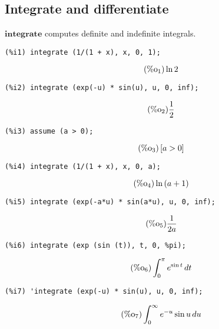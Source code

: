 \documentclass[12pt,leqno]{article}
\begin{document}
\subsection{Integrate and differentiate}

$\mathbf{integrate}$ computes definite and indefinite integrals.
\begin{verbatim}
(%i1) integrate (1/(1 + x), x, 0, 1);
\end{verbatim}
\begin{equation}
\tag{$\mathop{\mathrm{\%o}}_{1}$}\ln 2
\label{eq:doc-group1-code29-1-1}
\end{equation}
\begin{verbatim}
(%i2) integrate (exp(-u) * sin(u), u, 0, inf);
\end{verbatim}
\begin{equation}
\tag{$\mathop{\mathrm{\%o}}_{2}$}\frac{1}{2}
\label{eq:doc-group1-code29-2-1}
\end{equation}
\begin{verbatim}
(%i3) assume (a > 0);
\end{verbatim}
\begin{equation}
\tag{$\mathop{\mathrm{\%o}}_{3}$}\left[a > 0\right]
\label{eq:doc-group1-code29-3-1}
\end{equation}
\begin{verbatim}
(%i4) integrate (1/(1 + x), x, 0, a);
\end{verbatim}
\begin{equation}
\tag{$\mathop{\mathrm{\%o}}_{4}$}\ln \left(a+1\right)
\label{eq:doc-group1-code29-4-1}
\end{equation}
\begin{verbatim}
(%i5) integrate (exp(-a*u) * sin(a*u), u, 0, inf);
\end{verbatim}
\begin{equation}
\tag{$\mathop{\mathrm{\%o}}_{5}$}\frac{1}{2 a}
\label{eq:doc-group1-code29-5-1}
\end{equation}
\begin{verbatim}
(%i6) integrate (exp (sin (t)), t, 0, %pi);
\end{verbatim}
\begin{equation}
\tag{$\mathop{\mathrm{\%o}}_{6}$}\int_{0}^{\pi}{e}^{\sin t}\mathop{dt}
\label{eq:doc-group1-code29-6-1}
\end{equation}
\begin{verbatim}
(%i7) 'integrate (exp(-u) * sin(u), u, 0, inf);
\end{verbatim}
\begin{equation}
\tag{$\mathop{\mathrm{\%o}}_{7}$}\int_{0}^{\infty}{e}^{-u} \sin u\mathop{du}
\label{eq:doc-group1-code29-7-1}
\end{equation}
\end{document}
